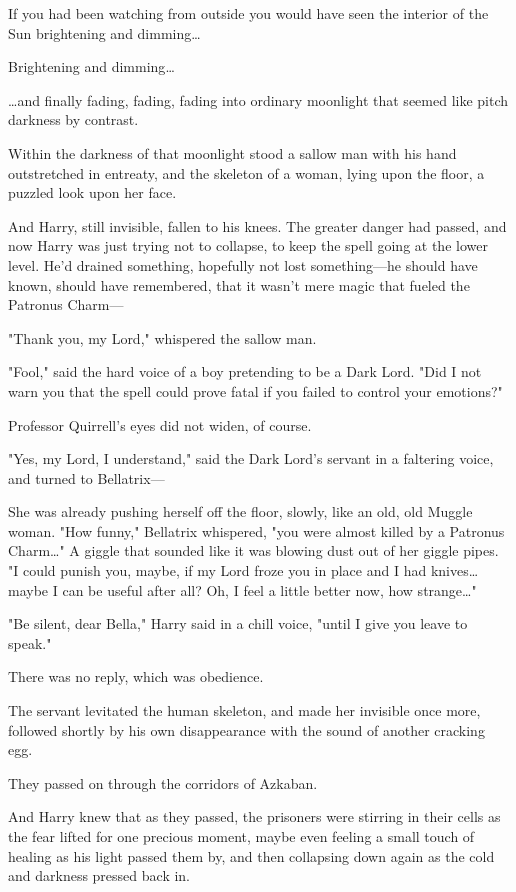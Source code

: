 If you had been watching from outside you would have seen the interior of the
Sun brightening and dimming{\ldots}

Brightening and dimming{\ldots}

{\ldots}and finally fading, fading, fading into ordinary moonlight that seemed
like pitch darkness by contrast.

Within the darkness of that moonlight stood a sallow man with his hand
outstretched in entreaty, and the skeleton of a woman, lying upon the floor, a
puzzled look upon her face.

And Harry, still invisible, fallen to his knees. The greater danger had passed,
and now Harry was just trying not to collapse, to keep the spell going at the
lower level. He'd drained something, hopefully not lost something---he
should have known, should have remembered, that it wasn't mere magic that
fueled the Patronus Charm---

"Thank you, my Lord," whispered the sallow man.

"Fool," said the hard voice of a boy pretending to be a Dark Lord. "Did I not
warn you that the spell could prove fatal if you failed to control your
emotions?"

Professor Quirrell's eyes did not widen, of course.

"Yes, my Lord, I understand," said the Dark Lord's servant in a faltering
voice, and turned to Bellatrix---

She was already pushing herself off the floor, slowly, like an old, old Muggle
woman. "How funny," Bellatrix whispered, "you were almost killed by a Patronus
Charm{\ldots}" A giggle that sounded like it was blowing dust out of her giggle
pipes. "I could punish you, maybe, if my Lord froze you in place and I had
knives{\ldots} maybe I can be useful after all? Oh, I feel a little better now,
how strange{\ldots}"

"Be silent, dear Bella," Harry said in a chill voice, "until I give you leave
to speak."

There was no reply, which was obedience.

The servant levitated the human skeleton, and made her invisible once more,
followed shortly by his own disappearance with the sound of another cracking
egg.

They passed on through the corridors of Azkaban.

And Harry knew that as they passed, the prisoners were stirring in their cells
as the fear lifted for one precious moment, maybe even feeling a small touch of
healing as his light passed them by, and then collapsing down again as the cold
and darkness pressed back in.

